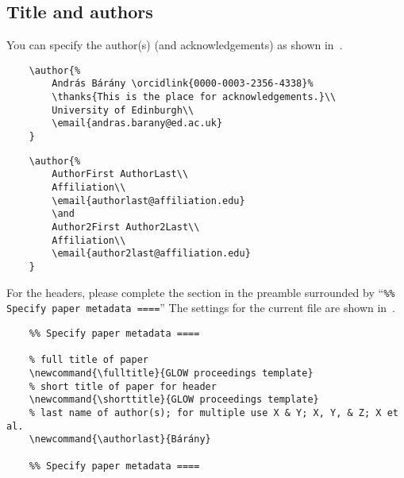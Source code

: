 \subsection{Title and authors}

You can specify the author(s) (and acknowledgements) as shown
in~.

\begin{listing}[ht]
    \begin{verbatim}
    \author{% 
        András Bárány \orcidlink{0000-0003-2356-4338}%
        \thanks{This is the place for acknowledgements.}\\
        University of Edinburgh\\
        \email{andras.barany@ed.ac.uk}
    }
    \end{verbatim}
    \caption{Single author}\label{lst:author-single}
\end{listing}

\begin{listing}[ht]
    \begin{verbatim}
    \author{%
        AuthorFirst AuthorLast\\
        Affiliation\\
        \email{authorlast@affiliation.edu}
        \and
        Author2First Author2Last\\
        Affiliation\\
        \email{author2last@affiliation.edu}
    }
    \end{verbatim}
    \caption{Multiple authors}\label{lst:author-multiple}
\end{listing}

For the headers, please complete the section in the preamble surrounded by 
\enquote{\texttt{\%\% Specify paper metadata ====}} The settings for the
current file are shown in~.

\begin{listing}[ht]
    \begin{verbatim}
    %% Specify paper metadata ====
    
    % full title of paper
    \newcommand{\fulltitle}{GLOW proceedings template}
    % short title of paper for header
    \newcommand{\shorttitle}{GLOW proceedings template}
    % last name of author(s); for multiple use X & Y; X, Y, & Z; X et al.
    \newcommand{\authorlast}{Bárány}
    
    %% Specify paper metadata ====
    \end{verbatim}
    \caption{Specifying title and headers}\label{lst:metadata}
\end{listing}

